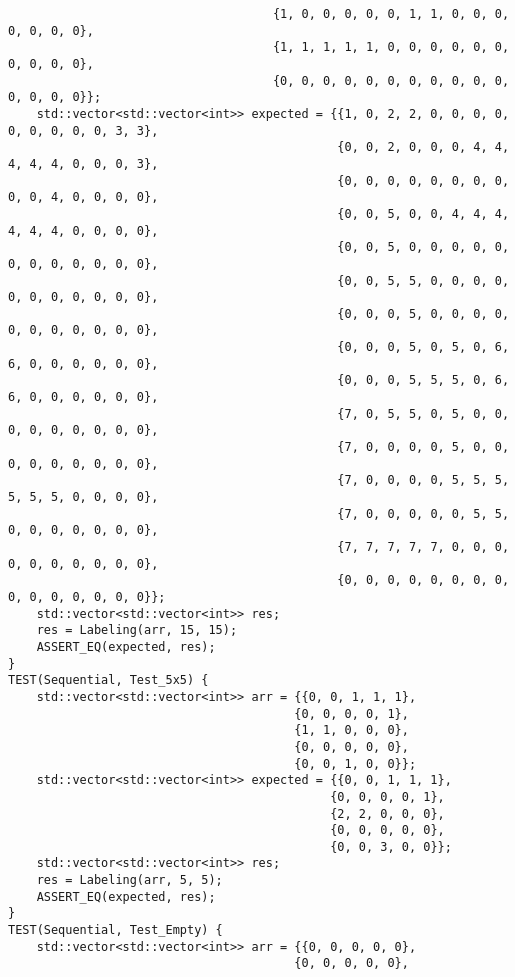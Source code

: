 \documentclass{report}
\begin{document}
\begin{lstlisting}
                                     {1, 0, 0, 0, 0, 0, 1, 1, 0, 0, 0, 0, 0, 0, 0},
                                     {1, 1, 1, 1, 1, 0, 0, 0, 0, 0, 0, 0, 0, 0, 0},
                                     {0, 0, 0, 0, 0, 0, 0, 0, 0, 0, 0, 0, 0, 0, 0}};
    std::vector<std::vector<int>> expected = {{1, 0, 2, 2, 0, 0, 0, 0, 0, 0, 0, 0, 0, 3, 3},
                                              {0, 0, 2, 0, 0, 0, 4, 4, 4, 4, 4, 0, 0, 0, 3},
                                              {0, 0, 0, 0, 0, 0, 0, 0, 0, 0, 4, 0, 0, 0, 0},
                                              {0, 0, 5, 0, 0, 4, 4, 4, 4, 4, 4, 0, 0, 0, 0},
                                              {0, 0, 5, 0, 0, 0, 0, 0, 0, 0, 0, 0, 0, 0, 0},
                                              {0, 0, 5, 5, 0, 0, 0, 0, 0, 0, 0, 0, 0, 0, 0},
                                              {0, 0, 0, 5, 0, 0, 0, 0, 0, 0, 0, 0, 0, 0, 0},
                                              {0, 0, 0, 5, 0, 5, 0, 6, 6, 0, 0, 0, 0, 0, 0},
                                              {0, 0, 0, 5, 5, 5, 0, 6, 6, 0, 0, 0, 0, 0, 0},
                                              {7, 0, 5, 5, 0, 5, 0, 0, 0, 0, 0, 0, 0, 0, 0},
                                              {7, 0, 0, 0, 0, 5, 0, 0, 0, 0, 0, 0, 0, 0, 0},
                                              {7, 0, 0, 0, 0, 5, 5, 5, 5, 5, 5, 0, 0, 0, 0},
                                              {7, 0, 0, 0, 0, 0, 5, 5, 0, 0, 0, 0, 0, 0, 0},
                                              {7, 7, 7, 7, 7, 0, 0, 0, 0, 0, 0, 0, 0, 0, 0},
                                              {0, 0, 0, 0, 0, 0, 0, 0, 0, 0, 0, 0, 0, 0, 0}};
    std::vector<std::vector<int>> res;
    res = Labeling(arr, 15, 15);
    ASSERT_EQ(expected, res);
}
TEST(Sequential, Test_5x5) {
    std::vector<std::vector<int>> arr = {{0, 0, 1, 1, 1},
                                        {0, 0, 0, 0, 1},
                                        {1, 1, 0, 0, 0},
                                        {0, 0, 0, 0, 0},
                                        {0, 0, 1, 0, 0}};
    std::vector<std::vector<int>> expected = {{0, 0, 1, 1, 1},
                                             {0, 0, 0, 0, 1},
                                             {2, 2, 0, 0, 0},
                                             {0, 0, 0, 0, 0},
                                             {0, 0, 3, 0, 0}};
    std::vector<std::vector<int>> res;
    res = Labeling(arr, 5, 5);
    ASSERT_EQ(expected, res);
}
TEST(Sequential, Test_Empty) {
    std::vector<std::vector<int>> arr = {{0, 0, 0, 0, 0},
                                        {0, 0, 0, 0, 0},

\end{lstlisting}
\end{document}
